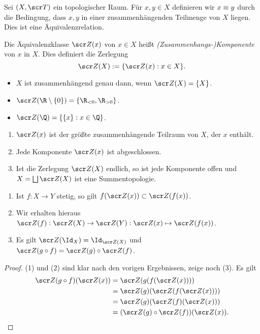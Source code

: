 \begin{df}
	Sei $(X, \scr T)$ ein topologischer Raum.
	Für $x,y \in X$ definieren wir $x \equiv y$ durch die Bedingung, dass $x,y$ in einer zusammenhängenden Teilmenge von $X$ liegen.
	Dies ist eine Äquivalenzrelation.

	Die Äquivalenzklasse $\scr Z(x)$ von $x \in X$ heißt \emph{(Zusammenhangs-)Komponente} von $x$ in $X$.
	Dies definiert die Zerlegung
	\[
		\scr Z(X) := \{ \scr Z(x) : x \in X \}.
	\]
\end{df}

\begin{ex}
	\begin{itemize}
		\item
			$X$ ist zusammenhängend genau dann, wenn $\scr Z(X) = \{X\}$.
		\item
			$\scr Z(\R \setminus \{0\}) = \{ \R_{<0}, \R_{>0} \}$.
		\item
			$\scr Z(\Q) = \{ \{x\} : x \in \Q \}$.
	\end{itemize}
\end{ex}

\begin{st}
	\begin{enumerate}[(1)]
		\item
			$\scr Z(x)$ ist der größte zusammenhängende Teilraum von $X$, der $x$ enthält.
		\item
			Jede Komponente $\scr Z(x)$ ist abgeschlossen.
		\item
			Ist die Zerlegung $\scr Z(X)$ endlich, so ist jede Komponente offen und $X = \bigdunion \scr Z(X)$ ist eine Summentopologie.
	\end{enumerate}
\end{st}

\begin{st}
	\begin{enumerate}[(1)]
		\item
			Ist $f: X \to Y$ stetig, so gilt $f(\scr Z(x)) \subset \scr Z(f(x))$.
		\item
			Wir erhalten hieraus $\scr Z(f): \scr Z(X) \to \scr Z(Y): \scr Z(x) \mapsto \scr Z(f(x))$.
		\item
			Es gilt $\scr Z(\Id_X) = \Id_{\scr Z(X)}$ und $\scr Z(g\circ f) = \scr Z(g) \circ \scr Z(f)$.
	\end{enumerate}
	\begin{proof}
		(1) und (2) sind klar nach den vorigen Ergebnissen, zeige noch (3).
		Es gilt
		\begin{align*}
			\scr Z(g\circ f) (\scr Z(x))
			&= \scr Z(g(f(\scr Z(x)))) \\
			&= \scr Z(g) (\scr Z(f(\scr Z(x)))) \\
			&= \scr Z(g)(\scr Z(f)(\scr Z(x))) \\
			&= (\scr Z(g) \circ \scr Z(f)) (\scr Z(x)).
		\end{align*}
	\end{proof}
\end{st}


